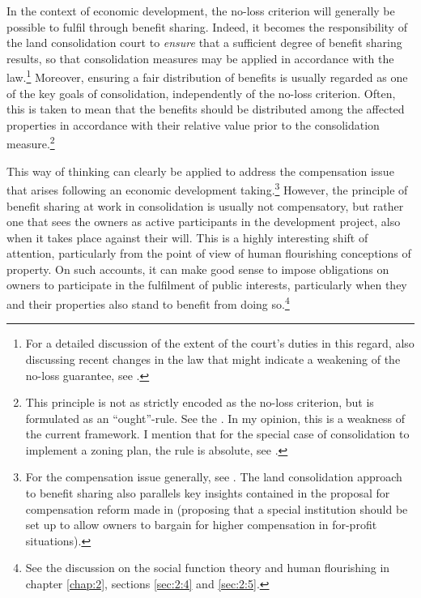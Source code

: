 
In the context of economic development, the no-loss criterion will generally be possible to fulfil  through benefit sharing. Indeed, it becomes the responsibility of the land consolidation court to {\it ensure} that a sufficient degree of benefit sharing results, so that consolidation measures may be applied in accordance with the law.\footnote{For a detailed discussion of the extent of the court's duties in this regard, also discussing recent changes in the law that might indicate a weakening of the no-loss guarantee, see \cite{hauge15}.} Moreover, ensuring a fair distribution of benefits is usually regarded as one of the key goals of consolidation, independently of the no-loss criterion. Often, this is taken to mean that the benefits should be distributed among the affected properties in accordance with their relative value prior to the consolidation measure.\footnote{This principle is not as strictly encoded as the no-loss criterion, but is formulated as an ``ought''-rule. See the \dni\cite[31|41]{lca79}. In my opinion, this is a weakness of the current framework. I mention that for the special case of consolidation to implement a zoning plan, the rule is absolute, see \dni\cite[3 b)]{lca79}.}

This way of thinking can clearly be applied to address the compensation issue that arises following an  economic development taking.\footnote{For the compensation issue generally, see \cite{fennell04,bell07}. The land consolidation approach to benefit sharing also parallels key insights contained in the proposal for compensation reform made in \cite{lehavi07} (proposing that a special institution should be set up to allow owners to bargain for higher compensation in for-profit situations).} However, the principle of benefit sharing at work in consolidation is usually not compensatory, but rather one that sees the owners as active participants in the development project, also when it takes place against their will. This is a highly interesting shift of attention, particularly from the point of view of human flourishing conceptions of property. On such accounts, it can make good sense to impose obligations on owners to participate in the fulfilment of public interests, particularly when they and their properties also stand to benefit from doing so.\footnote{See the discussion on the social function theory and human flourishing in chapter \ref{chap:2}, sections \ref{sec:2:4} and \ref{sec:2:5}.}

